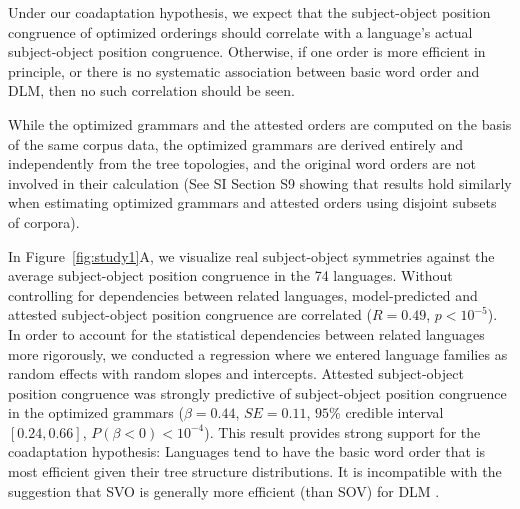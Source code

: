 \documentclass[11pt,a4paper]{article}
\newcommand\comment[1]{{\color{red}#1}}
\begin{document}
Under our coadaptation hypothesis, we expect that the subject-object position congruence of optimized orderings should correlate with a language's actual subject-object position congruence.
Otherwise, if one order is more efficient in principle, or there is no systematic association between basic word order and DLM, then no such correlation should be seen.


While the optimized grammars and the attested orders are computed on the basis of the same corpus data, the optimized grammars are derived entirely and independently from the tree topologies, and the original word orders are not involved in their calculation (See SI Section S9 showing that results hold similarly when estimating optimized grammars and attested orders using disjoint subsets of corpora).



In Figure~\ref{fig:study1}A, we visualize real subject-object symmetries against the average subject-object position congruence in the 74 languages.
Without controlling for dependencies between related languages, model-predicted and attested subject-object position congruence are correlated ($R=0.49$, $p<10^{-5}$).
In order to account for the statistical dependencies between related languages more rigorously, we conducted a regression where we entered language families as random effects with random slopes and intercepts.
Attested subject-object position congruence was strongly predictive of subject-object position congruence in the optimized grammars ($\beta = 0.44$, $SE=0.11$, $95\%$ credible interval $[0.24, 0.66]$, $P(\beta<0) < 10^{-4}$).
This result provides strong support for the coadaptation hypothesis: Languages tend to have the basic word order that is most efficient given their tree structure distributions.
It is incompatible with the suggestion that SVO is generally more efficient (than SOV) for DLM \citep{ferrer-i-cancho-placement-2017}.





\end{document}
